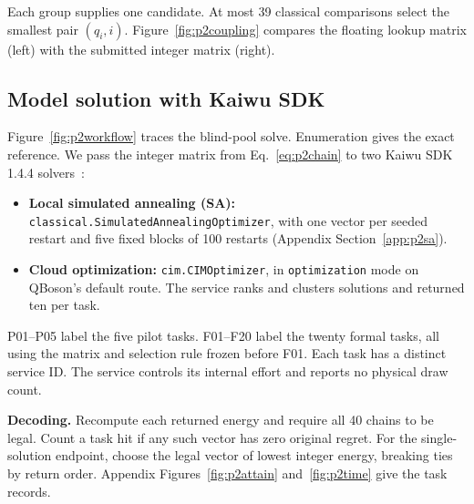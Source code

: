 Each group supplies one candidate. At most 39 classical comparisons select the smallest pair $(q_i,i)$. Figure~\ref{fig:p2coupling} compares the floating lookup matrix (left) with the submitted integer matrix (right).
\FloatBarrier

\subsection{Model solution with Kaiwu SDK}\label{sec:p2solve}
Figure~\ref{fig:p2workflow} traces the blind-pool solve. Enumeration gives the exact reference. We pass the integer matrix from Eq.~\eqref{eq:p2chain} to two Kaiwu SDK 1.4.4 solvers~\cite{kaiwu144}:
\begin{itemize}
\item \textbf{Local simulated annealing (SA):} \texttt{classical.\allowbreak Simulated\allowbreak Annealing\allowbreak Optimizer}, with one vector per seeded restart and five fixed blocks of 100 restarts (Appendix Section~\ref{app:p2sa}).
\item \textbf{Cloud optimization:} \texttt{cim.CIMOptimizer}, in \texttt{optimization} mode on QBoson's default route. The service ranks and clusters solutions and returned ten per task.
\end{itemize}
\FloatBarrier

P01--P05 label the five pilot tasks. F01--F20 label the twenty formal tasks, all using the matrix and selection rule frozen before F01. Each task has a distinct service ID. The service controls its internal effort and reports no physical draw count.

\textbf{Decoding.} Recompute each returned energy and require all 40 chains to be legal. Count a task hit if any such vector has zero original regret. For the single-solution endpoint, choose the legal vector of lowest integer energy, breaking ties by return order. Appendix Figures~\ref{fig:p2attain} and~\ref{fig:p2time} give the task records.

